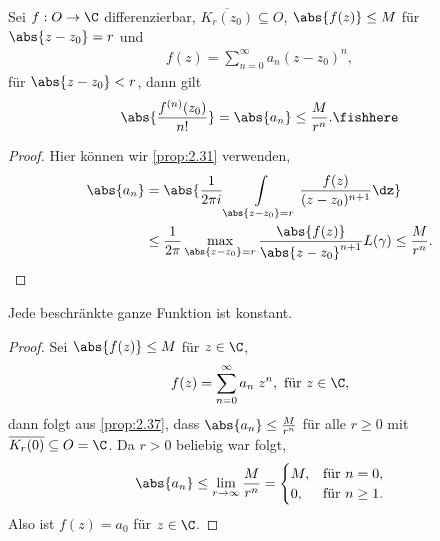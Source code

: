 \begin{prop}
\label{prop:2.37}
Sei $f: O\to\C$ differenzierbar, $\overline{K_r(z_0)}\subseteq O$, $\abs{f(z)}
\le M$ für $\abs{z-z_0}=r$ und
\begin{align*}
f(z) = \sum\limits_{n=0}^\infty a_n(z-z_0)^n,
\end{align*}
für $\abs{z-z_0}<r$, dann gilt
\begin{align*}
\abs{\frac{f^{(n)}(z_0)}{n!}} = \abs{a_n} \le \frac{M}{r^n}.\fishhere
\end{align*}
\end{prop}
\begin{proof}
Hier können wir \ref{prop:2.31} verwenden,
\begin{align*}
\abs{a_n} &= \abs{\frac{1}{2\pi i} \int\limits_{\abs{z-z_0}=r}
\frac{f(z)}{(z-z_0)^{n+1}}\dz} \\ &\le \frac{1}{2\pi} \max_{\abs{z-z_0}= r}
\frac{\abs{f(z)}}{\abs{z-z_0}^{n+1}}L(\gamma) \le \frac{M}{r^n}.\qedhere
\end{align*}
\end{proof}

\begin{prop}
\label{prop:2.38}
Jede beschränkte ganze Funktion ist konstant.\fishhere
\end{prop}
\begin{proof}
Sei $\abs{f(z)} \le M$ für $z\in\C$,
\begin{align*}
f(z) = \sum\limits_{n=0}^\infty a_n\;z^n, \text{ für } z\in\C,
\end{align*} 
dann folgt aus \ref{prop:2.37}, dass $\abs{a_n} \le \frac{M}{r^n}$ für alle
$r\ge 0$ mit $\overline{K_r(0)} \subseteq O = \C$. Da $r > 0$ beliebig war
folgt,
\begin{align*}
\abs{a_n} \le \lim\limits_{r\to\infty} \frac{M}{r^n} =
\begin{cases}
M, & \text{für } n=0,\\
0, & \text{für } n\ge1.
\end{cases}
\end{align*}
Also ist $f(z) = a_0$ für $z\in\C$.\qedhere
\end{proof}

